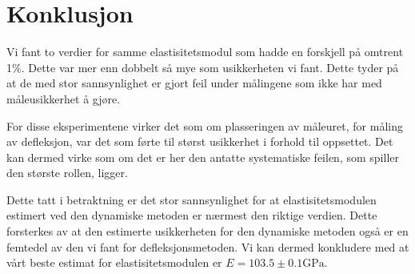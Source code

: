 \documentclass[a4paper,11pt, twocolumn]{article}
\begin{document}
\section{Konklusjon}
Vi fant to verdier for samme elastisitetsmodul som hadde en forskjell på omtrent 1\%. Dette var mer enn dobbelt så mye som usikkerheten vi fant. Dette tyder på at de med stor sannsynlighet er gjort feil under målingene som ikke har med måleusikkerhet å gjøre. 

For disse eksperimentene virker det som om plasseringen av måleuret, for måling av defleksjon, var det som førte til størst usikkerhet i forhold til oppsettet. Det kan dermed virke som om det er her den antatte systematiske feilen, som spiller den største rollen, ligger.

Dette tatt i betraktning er det stor sannsynlighet for at elastisitetsmodulen estimert ved den dynamiske metoden er nærmest den riktige verdien. Dette forsterkes av at den estimerte usikkerheten for den dynamiske metoden også er en femtedel av den vi fant for defleksjonsmetoden. Vi kan dermed konkludere med at vårt beste estimat for elastisitetsmodulen er $E = 103.5\pm0.1\text{GPa}$.

\printbibliography
\clearpage
\onecolumn
\appendix


\end{document}
